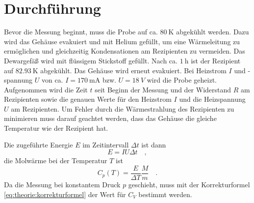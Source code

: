 

\section{Durchführung}
Bevor die Messung beginnt, muss die Probe auf ca. $\SI{80}{\kelvin}$
abgekühlt werden. Dazu wird das Gehäuse evakuiert und mit Helium gefüllt, um eine
Wärmeleitung zu ermöglichen und gleichzeitig
Kondensationen am Rezipienten zu vermeiden. Das Dewargefäß wird mit
flüssigem Stickstoff gefüllt. Nach ca. $\SI{1}{\hour}$ ist der Rezipient auf
$\SI{82.93}{\kelvin}$ abgekühlt. Das Gehäuse wird erneut evakuiert. Bei
Heizstrom $I$ und -spannung $U$ von ca. $I=\SI{170}{\milli \ampere}$ bzw. $U=\SI{18}{V}$ wird die Probe geheizt.
Aufgenommen wird die Zeit $t$ seit Beginn der Messung und der Widerstand $R$
am Rezipienten sowie die genauen Werte für den Heizstrom $I$ und die
Heizspannung $U$ am Rezipienten. Um Fehler durch die Wärmestrahlung des
Rezipienten zu minimieren muss darauf geachtet werden, dass das Gehäuse
die gleiche Temperatur wie der Rezipient hat.

Die zugeführte Energie $E$ im Zeitintervall $\Delta t$ ist dann
\begin{equation}
E = IU \Delta t  \quad ,
\end{equation}
die Molwärme bei der Temperatur $T$ ist
\begin{equation}
C_p (T) = \frac{E}{\Delta T} \frac{M}{m} \quad .
\label{eq:C_p}
\end{equation}
Da die Messung bei konstantem Druck $p$ geschieht, muss mit der Korrekturformel
\eqref{eq:theorie:korrekturformel} der Wert für $C_V$ bestimmt werden.

